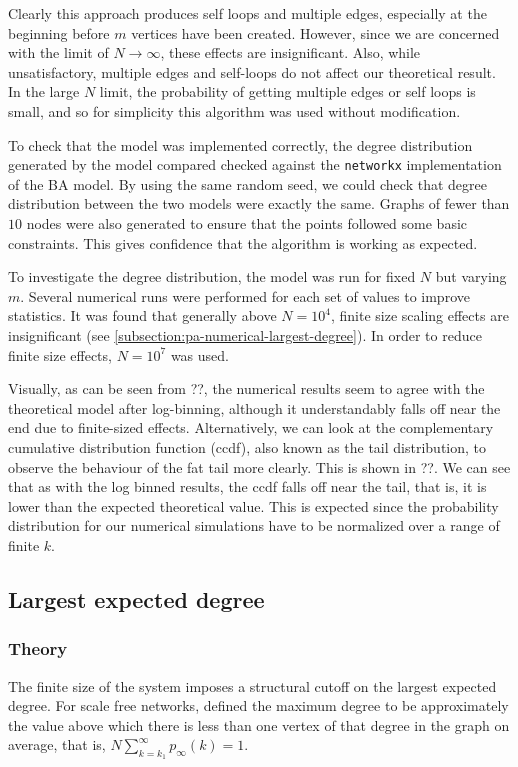 Clearly this approach produces self loops and multiple edges, especially at the beginning before $m$ vertices have been created. However, since we are concerned with the limit of $N \rightarrow \infty$, these effects are insignificant. Also, while unsatisfactory, multiple edges and self-loops do not affect our theoretical result. In the large $N$ limit, the probability of getting multiple edges or self loops is small, and so for simplicity this algorithm was used without modification. 

To check that the model was implemented correctly, the degree distribution generated by the model compared checked against the \texttt{networkx} implementation of the BA model. By using the same random seed, we could check that degree distribution between the two models were exactly the same. Graphs of fewer than $10$ nodes were also generated to ensure that the points followed some basic constraints. This gives confidence that the algorithm is working as expected. 

To investigate the degree distribution, the model was run for fixed $N$ but varying $m$. Several numerical runs were performed for each set of values to improve statistics. It was found that generally above $N=10^4$, finite size scaling effects are insignificant (see \autoref{subsection:pa-numerical-largest-degree}). In order to reduce finite size effects, $N=10^7$ was used. 

Visually, as can be seen from ??, the numerical results seem to agree with the theoretical model after log-binning, although it understandably falls off near the end due to finite-sized effects. Alternatively, we can look at the complementary cumulative distribution function (ccdf), also known as the tail distribution, to observe the behaviour of the fat tail more clearly. This is shown in ??. We can see that as with the log binned results, the ccdf falls off near the tail, that is, it is lower than the expected theoretical value. This is expected since the probability distribution for our numerical simulations have to be normalized over a range of finite $k$. 

\subsection{Largest expected degree}
\subsubsection{Theory}
The finite size of the system imposes a structural cutoff on the largest expected degree. For scale free networks, \citet{Aiello2001a} defined the maximum degree to be approximately the value above which there is less than one vertex of that degree in the graph on average, that is, $N \sum_{k = k_1}^\infty p_\infty(k) = 1$. 

